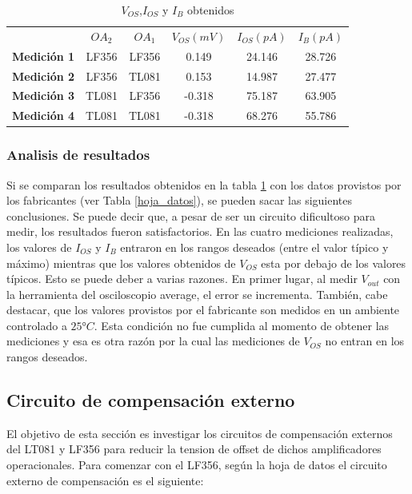 \begin{table}[ht]
    \centering
    \caption{$V_{OS}$,$I_{OS}$ y $I_B$ obtenidos}
    \label{table5}
    \begin{tabular}{@{}cccccc@{}}
    \textbf{}           & \textbf{$OA_2$} & \textbf{$OA_1$} & \textbf{$V_{OS} (mV)$}   & \textbf{$I_{OS} (pA)$} & \textbf{$I_B (pA)$} \\ 
    \textbf{Medición 1} & LF356          & LF356      & 0.149                          & 24.146                 & 28.726             \\
    \textbf{Medición 2} & LF356          & TL081      & 0.153                          & 14.987                 & 27.477                  \\
    \textbf{Medición 3} & TL081          & LF356      & -0.318                         & 75.187                 & 63.905                  \\
    \textbf{Medición 4} & TL081          & TL081      & -0.318                         & 68.276                 & 55.786                  \\ 
    \end{tabular}
\end{table}


\subsubsection{Analisis de resultados}
Si se comparan los resultados obtenidos en la tabla \ref{table5} con los datos provistos por los fabricantes (ver Tabla \ref{hoja_datos}), se pueden sacar las siguientes conclusiones. Se puede decir que, a pesar de 
ser un circuito dificultoso para medir, los resultados fueron satisfactorios. En las cuatro mediciones realizadas, los valores de $I_{OS}$ y $I_B$ entraron en los rangos deseados (entre el valor típico y máximo) mientras 
que los valores obtenidos de $V_{OS}$ esta por debajo de los valores típicos. Esto se puede deber a varias razones. En primer lugar, al medir $V_{out}$ con la herramienta del osciloscopio average, el error se incrementa. También, cabe destacar, que
los valores provistos por el fabricante son medidos en un ambiente controlado a $25 °C$. Esta condición no fue cumplida al momento de obtener las mediciones y esa es otra razón por la cual las mediciones de $V_{OS}$ no entran en los rangos deseados.   

\subsection{Circuito de compensación externo}
El objetivo de esta sección es investigar los circuitos de compensación externos del LT081 y LF356 para reducir la tension de offset de dichos amplificadores operacionales.
Para comenzar con el LF356, según la hoja de datos el circuito externo de compensación es el siguiente: 

